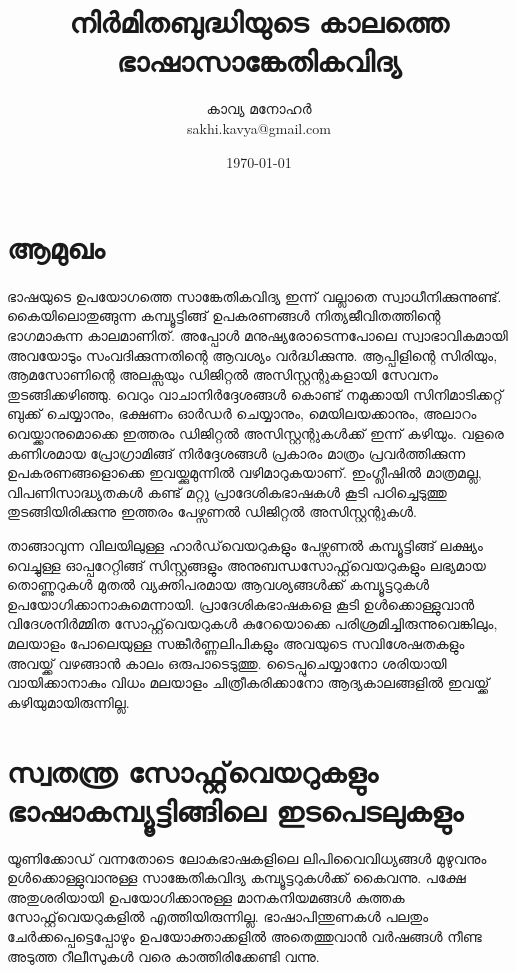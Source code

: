 \documentclass[12pt,twoside,a4paper]{article}
\title{\textbf{നിർമിതബുദ്ധിയുടെ കാലത്തെ ഭാഷാസാങ്കേതികവിദ്യ}}
\author{കാവ്യ മനോഹർ \\ sakhi.kavya@gmail.com}
\date{\today}
\begin{document}
\maketitle
{}


\section{ആമുഖം}
\paragraph{}
ഭാഷയുടെ ഉപയോഗത്തെ സാങ്കേതികവിദ്യ ഇന്ന് വല്ലാതെ സ്വാധീനിക്കുന്നുണ്ട്. കൈയിലൊതുങ്ങുന്ന കമ്പ്യൂട്ടിങ്ങ് ഉപകരണങ്ങൾ നിത്യജീവിതത്തിന്റെ ഭാഗമാകുന്ന കാലമാണിത്. അപ്പോൾ മനുഷ്യരോടെന്നപോലെ സ്വാഭാവികമായി അവയോടും സംവദിക്കുന്നതിന്റെ ആവശ്യം വർദ്ധിക്കുന്നു. ആപ്പിളിന്റെ സിരിയും, ആമസോണിന്റെ അലക്സയും ഡിജിറ്റൽ അസിസ്റ്റന്റുകളായി സേവനം തുടങ്ങിക്കഴിഞ്ഞു. വെറും വാചാനിർദ്ദേശങ്ങൾ കൊണ്ട് നമുക്കായി സിനിമാടിക്കറ്റ് ബുക്ക് ചെയ്യാനും, ഭക്ഷണം ഓർഡർ ചെയ്യാനും, മെയിലയക്കാനും, അലാറം വെയ്ക്കാനുമൊക്കെ ഇത്തരം ഡിജിറ്റൽ അസിസ്റ്റന്റുകൾക്ക് ഇന്ന് കഴിയും. വളരെ കണിശമായ പ്രോഗ്രാമിങ്ങ് നിർദ്ദേശങ്ങൾ പ്രകാരം മാത്രം പ്രവർത്തിക്കുന്ന ഉപകരണങ്ങളൊക്കെ ഇവയ്ക്കുമുന്നിൽ വഴിമാറുകയാണ്.  ഇംഗ്ലീഷിൽ മാത്രമല്ല, വിപണിസാദ്ധ്യതകൾ കണ്ട് മറ്റു പ്രാദേശികഭാഷകൾ കൂടി പഠിച്ചെടുത്തു തുടങ്ങിയിരിക്കുന്നു ഇത്തരം പേഴ്സണൽ ഡിജിറ്റൽ അസിസ്റ്റന്റുകൾ.

താങ്ങാവുന്ന വിലയിലുള്ള ഹാർഡ്‌വെയറുകളും പേഴ്സണൽ കമ്പ്യൂട്ടിങ്ങ് ലക്ഷ്യം വെച്ചുള്ള ഓപ്പറേറ്റിങ്ങ് സിസ്റ്റങ്ങളും അനുബന്ധസോഫ്റ്റ്‌വെയറുകളും ലഭ്യമായ തൊണ്ണുറുകൾ മുതൽ വ്യക്തിപരമായ ആവശ്യങ്ങൾക്ക്  കമ്പ്യൂട്ടറുകൾ ഉപയോഗിക്കാനാകുമെന്നായി. പ്രാദേശികഭാഷകളെ കൂടി ഉൾക്കൊള്ളുവാൻ  വിദേശനിർമ്മിത സോഫ്റ്റ്‌വെയറുകൾ കുറേയൊക്കെ പരിശ്രമിച്ചിരുന്നുവെങ്കിലും, മലയാളം പോലെയുള്ള സങ്കീർണ്ണലിപികളും അവയുടെ സവിശേഷതകളും അവയ്ക്ക് വഴങ്ങാൻ കാലം ഒരുപാടെടുത്തു. ടൈപ്പുചെയ്യാനോ ശരിയായി വായിക്കാനാകും വിധം മലയാളം ചിത്രീകരിക്കാനോ ആദ്യകാലങ്ങളിൽ ഇവയ്ക്ക് കഴിയുമായിരുന്നില്ല. 




\section{സ്വതന്ത്ര സോഫ്റ്റ്‌വെയറുകളും ഭാഷാകമ്പ്യൂട്ടിങ്ങിലെ ഇടപെടലുകളും}

യൂണിക്കോഡ് വന്നതോടെ ലോകഭാഷകളിലെ ലിപിവൈവിധ്യങ്ങൾ മുഴുവനും ഉൾക്കൊള്ളുവാനുള്ള സാങ്കേതികവിദ്യ കമ്പ്യൂട്ടറുകൾക്ക് കൈവന്നു. പക്ഷേ അതുശരിയായി ഉപയോഗിക്കാനുള്ള  മാനകനിയമങ്ങൾ കുത്തക സോഫ്റ്റ്‌വെയറുകളിൽ എത്തിയിരുന്നില്ല. ഭാഷാപിന്തുണകൾ പലതും ചേർക്കപ്പെട്ടെപ്പോഴും  ഉപയോക്താക്കളിൽ അതെത്തുവാൻ വർഷങ്ങൾ നീണ്ട അടുത്ത റീലീസുകൾ വരെ കാത്തിരിക്കേണ്ടി വന്നു. 
\end{document}
